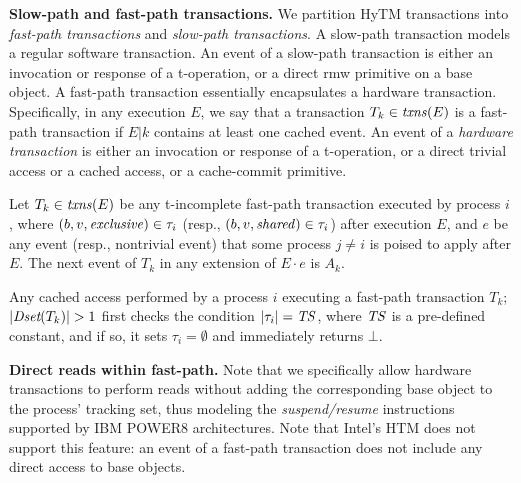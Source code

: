 \textbf{Slow-path and fast-path transactions.}
We partition HyTM transactions into \emph{fast-path transactions} and \emph{slow-path transactions}.
A slow-path transaction models a regular software transaction.
An event of a slow-path transaction is either an invocation or response of a t-operation, or
a direct rmw primitive on a base object. 
A fast-path transaction essentially encapsulates a hardware transaction. Specifically, in any execution $E$,
we say that a transaction $T_k\in \ms{txns}(E)$ is a fast-path transaction if $E|k$ contains at least one cached event.
An event of a \emph{hardware transaction} is either an invocation or response of a t-operation, or
a direct trivial access or a cached access, or a cache-commit primitive.
%
\begin{remark}
\label{re:traborts}
%
Let $T_k \in \ms{txns}(E)$ be any t-incomplete fast-path transaction executed by process $i$, 
where $(b,v,\mathit{exclusive})\in\tau_i$ (resp., $(b,v,\mathit{shared})\in\tau_i$) after execution $E$, and $e$ be any event (resp., nontrivial event) 
that some process $j\neq i$ is poised to apply after $E$.
The next event of $T_k$ in any extension of $E\cdot e$ is $A_k$.
%
\end{remark}
%
%
\begin{remark}
\label{re:capacity}
Any cached access performed by a process $i$ executing a fast-path 
transaction $T_k$; $|\Dset(T_k)|>1$ first checks the condition $|\tau_i|=\mathit{TS}$, where $\mathit{TS}$ is a pre-defined constant, and if so, it
sets $\tau_i=\emptyset$ and immediately returns $\bot$. 
\end{remark}

\textbf{Direct reads within fast-path.}
Note that we specifically allow hardware transactions to perform reads without adding the corresponding base object to
the process' tracking set, thus modeling the \emph{suspend/resume} instructions supported by 
IBM POWER8 architectures. Note that Intel's HTM does not support this feature: an event of a fast-path transaction
does not include any direct access to base objects.

